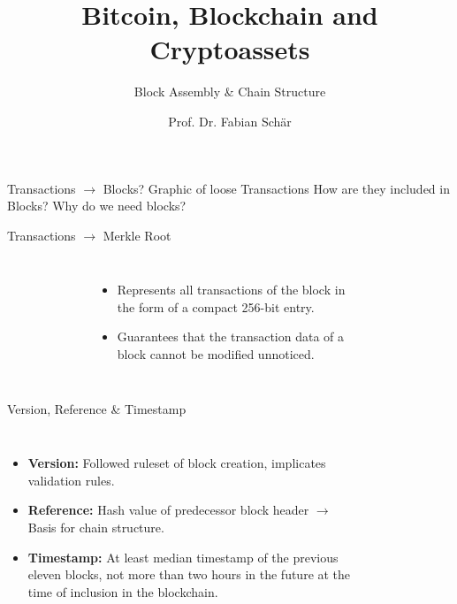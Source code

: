 \documentclass[]{beamer}
\title{Bitcoin, Blockchain and Cryptoassets}
\subtitle{Block Assembly \& Chain Structure}
\author{Prof. Dr. Fabian Schär}
\institute{University of Basel}
\begin{document}
\thispagestyle{empty}
\begin{frame}[noframenumbering]
	\titlepage
\end{frame}

\begin{frame}{Transactions $\rightarrow$ Blocks?}
Graphic of loose Transactions
How are they included in Blocks?
Why do we need blocks?
\end{frame}

\begin{frame}{Transactions $\rightarrow$ Merkle Root}
\begin{columns}
\begin{figure}
	
\end{figure}
\begin{itemize}
	\item Represents all transactions of the block in the form of a compact 256-bit entry.
	\item Guarantees that the transaction data of a block cannot be modified unnoticed.
\end{itemize}

\begin{figure}
	
\end{figure}
\end{columns}
\end{frame}


\begin{frame}{Version, Reference \& Timestamp}
\begin{columns}
\begin{itemize}
	\item \textbf{Version:} Followed ruleset of block creation, implicates validation rules.
	\item \textbf{Reference:} Hash value of predecessor block header $\rightarrow$ Basis for chain structure.
	\item \textbf{Timestamp:} At least median timestamp of the previous eleven blocks, not more than two hours in the future at the time of inclusion in the blockchain. 
\end{itemize}
\begin{figure}
	
\end{figure}
\end{columns}
\end{frame}
\end{document}
